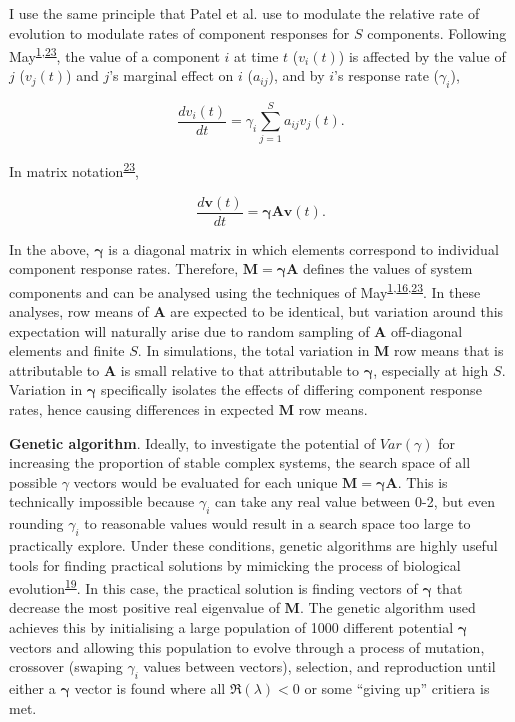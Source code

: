 \documentclass[]{article}
\begin{document}
I use the same principle that Patel et al. use to modulate the relative
rate of evolution to modulate rates of component responses for \(S\)
components. Following
May\textsuperscript{\protect\hyperlink{ref-May1972}{1},\protect\hyperlink{ref-May1973}{23}},
the value of a component \(i\) at time \(t\) (\(v_{i}(t)\)) is affected
by the value of \(j\) (\(v_{j}(t)\)) and \(j\)'s marginal effect on
\(i\) (\(a_{ij}\)), and by \(i\)'s response rate (\(\gamma_{i}\)),

\[\frac{dv_{i}(t)}{dt} = \gamma_{i} \sum_{j=1}^{S}a_{ij}v_{j}(t).\]

In matrix notation\textsuperscript{\protect\hyperlink{ref-May1973}{23}},

\[\frac{d\mathbf{v}(t)}{dt} = \mathbf{\gamma} \mathbf{A}\mathbf{v}(t).\]

In the above, \(\mathbf{\gamma}\) is a diagonal matrix in which elements
correspond to individual component response rates. Therefore,
\(\mathbf{M} = \mathbf{\gamma} \mathbf{A}\) defines the values of system
components and can be analysed using the techniques of
May\textsuperscript{\protect\hyperlink{ref-May1972}{1},\protect\hyperlink{ref-Ahmadian2015}{16},\protect\hyperlink{ref-May1973}{23}}.
In these analyses, row means of \(\mathbf{A}\) are expected to be
identical, but variation around this expectation will naturally arise
due to random sampling of \(\mathbf{A}\) off-diagonal elements and
finite \(S\). In simulations, the total variation in \(\mathbf{M}\) row
means that is attributable to \(\mathbf{A}\) is small relative to that
attributable to \(\mathbf{\gamma}\), especially at high \(S\). Variation
in \(\mathbf{\gamma}\) specifically isolates the effects of differing
component response rates, hence causing differences in expected
\(\mathbf{M}\) row means.

\textbf{Genetic algorithm}. Ideally, to investigate the potential of
\(Var(\gamma)\) for increasing the proportion of stable complex systems,
the search space of all possible \(\gamma\) vectors would be evaluated
for each unique \(\mathbf{M = \gamma A}\). This is technically
impossible because \(\gamma_{i}\) can take any real value between 0-2,
but even rounding \(\gamma_{i}\) to reasonable values would result in a
search space too large to practically explore. Under these conditions,
genetic algorithms are highly useful tools for finding practical
solutions by mimicking the process of biological
evolution\textsuperscript{\protect\hyperlink{ref-Hamblin2013}{19}}. In
this case, the practical solution is finding vectors of
\(\mathbf{\gamma}\) that decrease the most positive real eigenvalue of
\(\mathbf{M}\). The genetic algorithm used achieves this by initialising
a large population of 1000 different potential \(\mathbf{\gamma}\)
vectors and allowing this population to evolve through a process of
mutation, crossover (swaping \(\gamma_{i}\) values between vectors),
selection, and reproduction until either a \(\mathbf{\gamma}\) vector is
found where all \(\Re(\lambda) < 0\) or some ``giving up'' critiera is
met.
\end{document}
